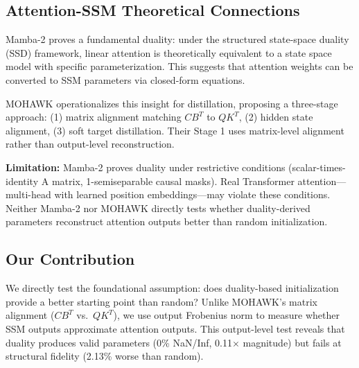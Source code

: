 \subsection{Attention-SSM Theoretical Connections}

Mamba-2 \citep{dao2024mamba2} proves a fundamental duality: under the structured state-space duality (SSD) framework, linear attention is theoretically equivalent to a state space model with specific parameterization. This suggests that attention weights can be converted to SSM parameters via closed-form equations.

MOHAWK \citep{waleffe2024mohawk} operationalizes this insight for distillation, proposing a three-stage approach: (1) matrix alignment matching $CB^T$ to $QK^T$, (2) hidden state alignment, (3) soft target distillation. Their Stage 1 uses matrix-level alignment rather than output-level reconstruction.

\textbf{Limitation:} Mamba-2 proves duality under restrictive conditions (scalar-times-identity A matrix, 1-semiseparable causal masks). Real Transformer attention---multi-head with learned position embeddings---may violate these conditions. Neither Mamba-2 nor MOHAWK directly tests whether duality-derived parameters reconstruct attention outputs better than random initialization.

\subsection{Our Contribution}

We directly test the foundational assumption: does duality-based initialization provide a better starting point than random? Unlike MOHAWK's matrix alignment ($CB^T$ vs.\ $QK^T$), we use output Frobenius norm to measure whether SSM outputs approximate attention outputs. This output-level test reveals that duality produces valid parameters (0\% NaN/Inf, 0.11$\times$ magnitude) but fails at structural fidelity (2.13\% worse than random).
